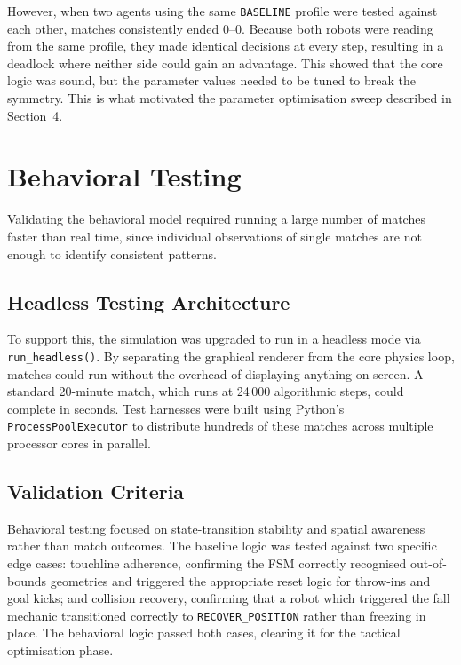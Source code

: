 \documentclass[12pt, a4paper]{report}
\begin{document}
However, when two agents using the same \texttt{BASELINE} profile were
tested against each other, matches consistently ended 0--0.
Because both robots were reading from the same profile, they made identical
decisions at every step, resulting in a deadlock where neither side could
gain an advantage.
This showed that the core logic was sound, but the parameter values needed
to be tuned to break the symmetry.
This is what motivated the parameter optimisation sweep described in
Section~4.

\section{Behavioral Testing}

Validating the behavioral model required running a large number of matches
faster than real time, since individual observations of single matches are
not enough to identify consistent patterns.

\subsection{Headless Testing Architecture}

To support this, the simulation was upgraded to run in a headless mode via
\texttt{run\_headless()}.
By separating the graphical renderer from the core physics loop, matches
could run without the overhead of displaying anything on screen.
A standard 20-minute match, which runs at 24\,000 algorithmic steps, could
complete in seconds.
Test harnesses were built using Python's \texttt{ProcessPoolExecutor} to
distribute hundreds of these matches across multiple processor cores in
parallel.

\subsection{Validation Criteria}

Behavioral testing focused on state-transition stability and spatial
awareness rather than match outcomes.
The baseline logic was tested against two specific edge cases: touchline
adherence, confirming the FSM correctly recognised out-of-bounds geometries
and triggered the appropriate reset logic for throw-ins and goal kicks; and
collision recovery, confirming that a robot which triggered the fall mechanic
transitioned correctly to \texttt{RECOVER\_POSITION} rather than freezing in
place.
The behavioral logic passed both cases, clearing it for the tactical
optimisation phase.
\end{document}

